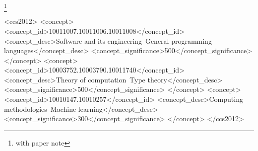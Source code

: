 \documentclass[acmlarge,review,anonymous]{acmart}\settopmatter{printfolios=true}
\begin{document}
\author{Westley Weimer}

\author{Ranjit Jhala}

\thanks{with paper note}                %





\begin{CCSXML}
<ccs2012>
<concept>
<concept_id>10011007.10011006.10011008</concept_id>
<concept_desc>Software and its engineering~General programming languages</concept_desc>
<concept_significance>500</concept_significance>
</concept>
<concept>
<concept_id>10003752.10003790.10011740</concept_id>
<concept_desc>Theory of computation~Type theory</concept_desc>
<concept_significance>500</concept_significance>
</concept>
<concept>
<concept_id>10010147.10010257</concept_id>
<concept_desc>Computing methodologies~Machine learning</concept_desc>
<concept_significance>300</concept_significance>
</concept>
</ccs2012>
\end{CCSXML}
\end{document}
